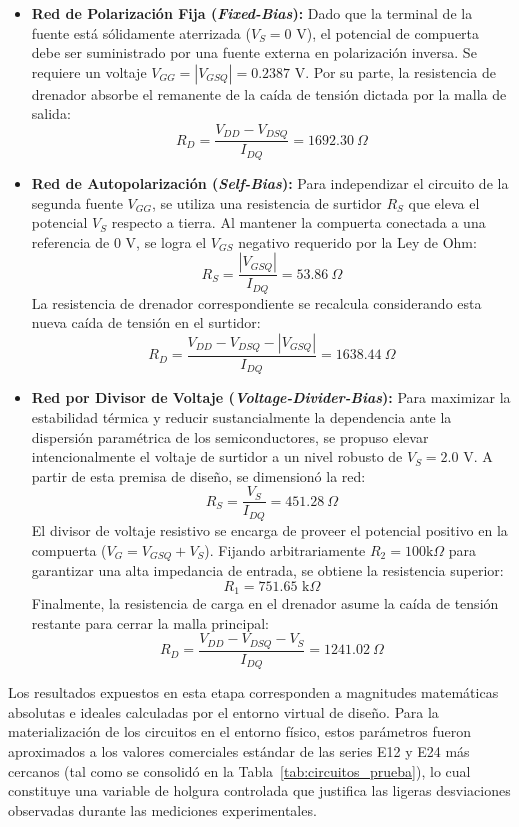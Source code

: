 \documentclass[conference]{IEEEtran}
\begin{document}
\begin{itemize}
    \item \textbf{Red de Polarización Fija (\textit{Fixed-Bias}):}
          Dado que la terminal de la fuente está sólidamente aterrizada ($V_S = 0\text{ V}$), el potencial de compuerta debe ser suministrado por una fuente externa en polarización inversa. Se requiere un voltaje $V_{GG} = |V_{GSQ}| = 0.2387\text{ V}$. Por su parte, la resistencia de drenador absorbe el remanente de la caída de tensión dictada por la malla de salida:
          \[ R_D = \frac{V_{DD} - V_{DSQ}}{I_{DQ}} = 1692.30\ \Omega \]

    \item \textbf{Red de Autopolarización (\textit{Self-Bias}):}
          Para independizar el circuito de la segunda fuente $V_{GG}$, se utiliza una resistencia de surtidor $R_S$ que eleva el potencial $V_S$ respecto a tierra. Al mantener la compuerta conectada a una referencia de $0\text{ V}$, se logra el $V_{GS}$ negativo requerido por la Ley de Ohm:
          \[ R_S = \frac{|V_{GSQ}|}{I_{DQ}} = 53.86\ \Omega \]
          La resistencia de drenador correspondiente se recalcula considerando esta nueva
          caída de tensión en el surtidor:
          \[ R_D = \frac{V_{DD} - V_{DSQ} - |V_{GSQ}|}{I_{DQ}} = 1638.44\ \Omega \]

    \item \textbf{Red por Divisor de Voltaje (\textit{Voltage-Divider-Bias}):}
          Para maximizar la estabilidad térmica y reducir sustancialmente la dependencia ante la dispersión paramétrica de los semiconductores, se propuso elevar intencionalmente el voltaje de surtidor a un nivel robusto de $V_S = 2.0\text{ V}$. A partir de esta premisa de diseño, se dimensionó la red:
          \[ R_S = \frac{V_S}{I_{DQ}} = 451.28\ \Omega \]
          El divisor de voltaje resistivo se encarga de proveer el potencial positivo en
          la compuerta ($V_G = V_{GSQ} + V_S$). Fijando arbitrariamente $R_2 = 100\text{
                  k}\Omega$ para garantizar una alta impedancia de entrada, se obtiene la
          resistencia superior:
          \[ R_1 = 751.65\text{ k}\Omega \]
          Finalmente, la resistencia de carga en el drenador asume la caída de tensión
          restante para cerrar la malla principal:
          \[ R_D = \frac{V_{DD} - V_{DSQ} - V_S}{I_{DQ}} = 1241.02\ \Omega \]
\end{itemize}

Los resultados expuestos en esta etapa corresponden a magnitudes matemáticas
absolutas e ideales calculadas por el entorno virtual de diseño. Para la
materialización de los circuitos en el entorno físico, estos parámetros fueron
aproximados a los valores comerciales estándar de las series E12 y E24 más
cercanos (tal como se consolidó en la Tabla~\ref{tab:circuitos_prueba}), lo
cual constituye una variable de holgura controlada que justifica las ligeras
desviaciones observadas durante las mediciones experimentales.
\end{document}
